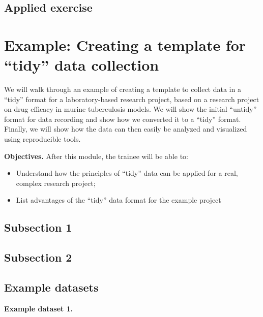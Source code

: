 \documentclass[]{tufte-book}
\providecommand{\tightlist}{%
  \setlength{\itemsep}{0pt}\setlength{\parskip}{0pt}}
\begin{document}
\hypertarget{applied-exercise}{%
\subsection{Applied exercise}\label{applied-exercise}}

\hypertarget{example-creating-a-template-for-tidy-data-collection}{%
\section{Example: Creating a template for ``tidy'' data collection}\label{example-creating-a-template-for-tidy-data-collection}}

We will walk through an example of creating a template to collect data in a
``tidy'' format for a laboratory-based research project, based on a research
project on drug efficacy in murine tuberculosis models. We will show the initial
``untidy'' format for data recording and show how we converted it to a ``tidy''
format. Finally, we will show how the data can then easily be analyzed and
visualized using reproducible tools.

\textbf{Objectives.} After this module, the trainee will be able to:

\begin{itemize}
\tightlist
\item
  Understand how the principles of ``tidy'' data can be applied for a real, complex research project;
\item
  List advantages of the ``tidy'' data format for the example project
\end{itemize}

\hypertarget{subsection-1}{%
\subsection{Subsection 1}\label{subsection-1}}

\hypertarget{subsection-2}{%
\subsection{Subsection 2}\label{subsection-2}}

\hypertarget{example-datasets}{%
\subsection{Example datasets}\label{example-datasets}}

\textbf{Example dataset 1.}
\end{document}
